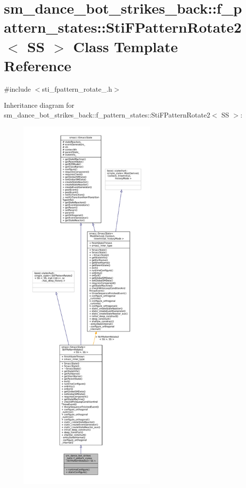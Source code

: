 \hypertarget{structsm__dance__bot__strikes__back_1_1f__pattern__states_1_1StiFPatternRotate2}{}\section{sm\+\_\+dance\+\_\+bot\+\_\+strikes\+\_\+back\+:\+:f\+\_\+pattern\+\_\+states\+:\+:Sti\+F\+Pattern\+Rotate2$<$ SS $>$ Class Template Reference}
\label{structsm__dance__bot__strikes__back_1_1f__pattern__states_1_1StiFPatternRotate2}


{\ttfamily \#include $<$sti\+\_\+fpattern\+\_\+rotate\+\_.\+h$>$}



Inheritance diagram for sm\+\_\+dance\+\_\+bot\+\_\+strikes\+\_\+back\+:\+:f\+\_\+pattern\+\_\+states\+:\+:Sti\+F\+Pattern\+Rotate2$<$ SS $>$\+:
\nopagebreak
\begin{figure}[H]
\begin{center}
\leavevmode
\includegraphics[height=550pt]{structsm__dance__bot__strikes__back_1_1f__pattern__states_1_1StiFPatternRotate2__inherit__graph}
\end{center}
\end{figure}


